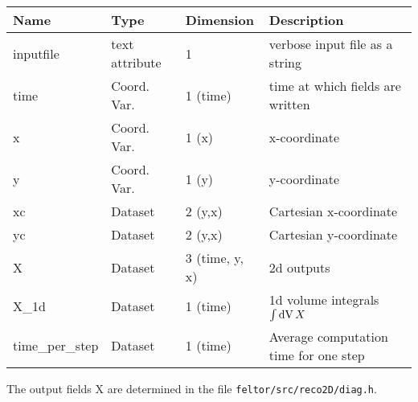 \begin{longtable}{lll>{\RaggedRight}p{7cm}}
\toprule
\rowcolor{gray!50}\textbf{Name} &  \textbf{Type} & \textbf{Dimension} & \textbf{Description}  \\ \midrule
inputfile        & text attribute & 1 & verbose input file as a string \\
time             & Coord. Var. & 1 (time) & time at which fields are written \\
x                & Coord. Var. & 1 (x) & x-coordinate  \\
y                & Coord. Var. & 1 (y) & y-coordinate \\
xc               & Dataset & 2 (y,x) & Cartesian x-coordinate  \\
yc               & Dataset & 2 (y,x) & Cartesian y-coordinate \\
X                & Dataset & 3 (time, y, x) & 2d outputs \\
X\_1d            & Dataset & 1 (time) & 1d volume integrals $\int \mathrm{dV}\, X$ \\
time\_per\_step  & Dataset & 1 (time) & Average computation time for one step \\
\bottomrule
\end{longtable}
The output fields X are determined in the file \texttt{feltor/src/reco2D/diag.h}.



